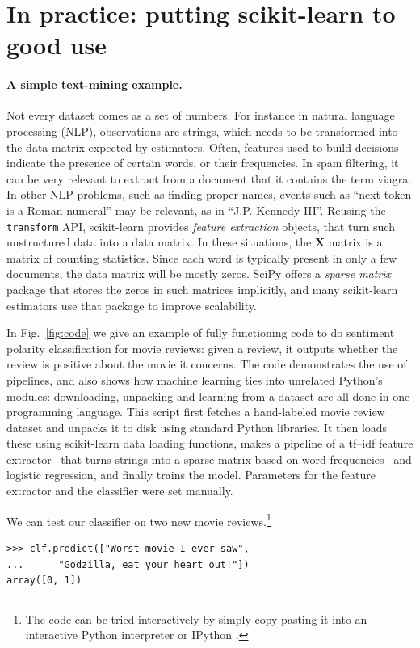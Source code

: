 \documentclass[a4paper]{article}
\begin{document}
\section{In practice: putting scikit-learn to good use}

\paragraph{A simple text-mining example.}
%
Not every dataset comes as a set of numbers. For instance in natural
language processing (NLP), observations are strings,
which needs to be transformed into the data matrix expected by
estimators. Often, features used to build decisions indicate the
presence of certain words, or their frequencies.
In spam filtering, it can be very relevant to extract from a document that
it contains the term \textsf{viagra}.
In other NLP problems, such as finding proper names,
events such as ``next token is a Roman numeral'' may be relevant, as in
``J.P. Kennedy III''.
Reusing the {\tt transform} API, scikit-learn
provides \emph{feature extraction} objects, that turn such
unstructured data into a data matrix. In these situations, the
$\textbf{X}$ matrix is a matrix of counting statistics.
Since each word is typically present in only a few documents,
the data matrix will be mostly zeros.
SciPy offers a \emph{sparse matrix} package
that stores the zeros in such matrices implicitly,
and many scikit-learn estimators use that package to improve scalability.

In Fig.~\ref{fig:code} we give an example of fully functioning code to
do sentiment polarity classification for movie reviews: given a review,
it outputs whether the review is positive about the movie it concerns.
The code demonstrates the use of pipelines, and also shows how machine
learning ties into unrelated Python's modules: downloading, unpacking and
learning from a dataset are all done in one programming language.
This script first fetches a hand-labeled movie review dataset
\cite{pang2004} and unpacks it to disk using standard Python libraries.
It then loads these using scikit-learn data loading functions, makes a
pipeline of a \textsf{tf--idf} feature extractor
\cite{rennie2003tackling} --that turns strings into a sparse matrix based
on word frequencies-- and logistic regression, and finally trains the
model. Parameters for the feature extractor and the classifier
were set manually.

We can test our classifier on two new movie reviews.\footnote{
  The code can be tried interactively by simply copy-pasting it
  into an interactive Python interpreter or IPython \cite{perez2007ipython}.
}
\begin{lstlisting}
>>> clf.predict(["Worst movie I ever saw",
...      "Godzilla, eat your heart out!"])
array([0, 1])
\end{lstlisting}
\end{document}

